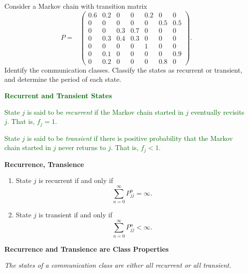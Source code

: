 \documentclass[hidelinks]{article}
\begin{document}
Consider a Markov chain with transition matrix
\[
P=\begin{array}{c}
\\[-1.2ex]
\end{array}
\left(
\begin{array}{ccccccc}
0.6 & 0.2 & 0   & 0   & 0.2 & 0   & 0\\
0   & 0   & 0   & 0   & 0   & 0.5 & 0.5\\
0   & 0   & 0.3 & 0.7 & 0   & 0   & 0\\
0   & 0.3 & 0.4 & 0.3 & 0   & 0   & 0\\
0   & 0   & 0   & 0   & 1   & 0   & 0\\
0   & 0.1 & 0   & 0   & 0   & 0   & 0.9\\
0   & 0.2 & 0   & 0   & 0   & 0.8 & 0
\end{array}
\right).
\]
Identify the communication classes. Classify the states as recurrent or transient, and determine the period of each state.

\smallskip

\noindent \textcolor{darkgreen}{
\noindent \textbf{Recurrent and Transient States}
}

\noindent \textcolor{darkgreen}{
State $j$ is said to be \emph{recurrent} if the Markov chain started in $j$
eventually revisits $j$. That is, $f_j = 1$.
}

\noindent \textcolor{darkgreen}{
State $j$ is said to be \emph{transient} if there is positive probability that
the Markov chain started in $j$ never returns to $j$. That is, $f_j < 1$.
}

\medskip

{\noindent \color{darkgreen}
\textbf{Recurrence, Transience}
}

{\color{darkgreen}
\begin{enumerate}
\item[(i)] State $j$ is recurrent if and only if
\[
\sum_{n=0}^{\infty} P^{n}_{jj} = \infty .
\]

\item[(ii)] State $j$ is transient if and only if
\[
\sum_{n=0}^{\infty} P^{n}_{jj} < \infty .
\]
\end{enumerate}
}

{\noindent \color{darkgreen}
\textbf{Recurrence and Transience are Class Properties}
}

{\noindent \color{darkgreen}
\emph{The states of a communication class are either all recurrent
or all transient.}
}

\medskip
\end{document}
